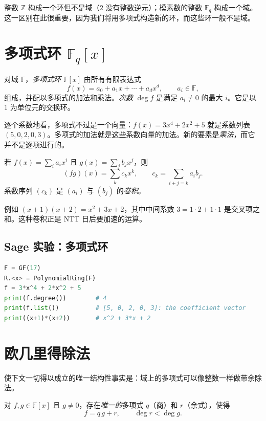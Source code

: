 整数 $\mathbb{Z}$ 构成一个环但不是域（$2$ 没有整数逆元）；模素数的整数 $\mathbb{F}_q$ 构成一个域。这一区别在此很重要，因为我们将用多项式构造新的环，而这些环一般不是域。

\section{多项式环 $\mathbb{F}_q[x]$}
\begin{definition}[多项式环]
对域 $\mathbb{F}$，\emph{多项式环} $\mathbb{F}[x]$ 由所有有限表达式
\[
f(x) = a_0 + a_1 x + \cdots + a_d x^d,\qquad a_i\in\mathbb{F},
\]
组成，并配以多项式的加法和乘法。\emph{次数} $\deg f$ 是满足 $a_i\neq 0$ 的最大 $i$。它是以 $1$ 为单位元的交换环。
\end{definition}

逐个系数地看，多项式不过是一个向量：$f(x)=3x^4+2x^2+5$ 就是系数列表 $(5,0,2,0,3)$。多项式的加法就是这些系数向量的加法。新的要素是\emph{乘法}，而它并不是逐项进行的。

\begin{proposition}[乘法即卷积]
若 $f(x)=\sum_i a_i x^i$ 且 $g(x)=\sum_j b_j x^j$，则
\[
(fg)(x) = \sum_{k} c_k x^k, \qquad c_k = \sum_{i+j=k} a_i b_j.
\]
系数序列 $(c_k)$ 是 $(a_i)$ 与 $(b_j)$ 的\emph{卷积}。
\end{proposition}

例如 $(x+1)(x+2)=x^2+3x+2$，其中中间系数 $3=1\cdot 2+1\cdot 1$ 是交叉项之和。这种卷积正是 NTT 日后要加速的运算。

\subsection{Sage 实验：多项式环}

\begin{lstlisting}[language=Python]
F = GF(17)
R.<x> = PolynomialRing(F)
f = 3*x^4 + 2*x^2 + 5
print(f.degree())        # 4
print(f.list())          # [5, 0, 2, 0, 3]: the coefficient vector
print((x+1)*(x+2))       # x^2 + 3*x + 2
\end{lstlisting}

\section{欧几里得除法}
使下文一切得以成立的唯一结构性事实是：域上的多项式可以像整数一样做带余除法。

\begin{theorem}
对 $f,g\in\mathbb{F}[x]$ 且 $g\neq 0$，存在\emph{唯一的}多项式 $q$（商）和 $r$（余式），使得
\[
f = q\,g + r, \qquad \deg r < \deg g.
\]
\end{theorem}

